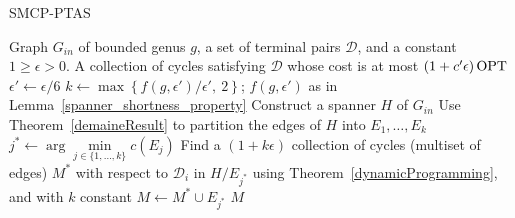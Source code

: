 \begin{algorithm}
\caption{SMCP-PTAS}
\label{smcp-ptas}
\begin{algorithmic}[1]

\Require Graph \(G_{in}\) of bounded genus \(g\), a set of terminal pairs \(\mathcal{D}\), and a constant \(1 \geq \epsilon > 0\).
\Ensure A collection of cycles satisfying \(\mathcal{D}\) whose cost is at most \((1 + c' \epsilon) \operatorname{\textrm{OPT}}\)
\State  \(\epsilon' \gets \epsilon / 6\)
\State  \(k \gets \max\left \{ f(g, \epsilon')/{\epsilon'}, \: 2\right \}\); \(f(g, \epsilon')\) as in Lemma~\ref{spanner_shortness_property} \label{alg_smcp_ptas:k}
\State Construct a spanner \(H\) of \(G_{in}\) \label{alg_smcp_ptas:SpannerCall}
\State Use Theorem~\ref{demaineResult} to partition the edges of \(H\) into \(E_1, \dots, E_k\) \label{alg_smcp_ptas:partDemaine}
\State  \(j^\ast \gets \arg\min\limits_{j \in \{1,\ldots,k\}} c(E_j)\)
\State Find a \((1 + k \epsilon)\) collection of cycles (multiset of edges) \(M^\ast\) with respect to \(\mathcal{D}_i\) in \(H/E_{j^\ast}\) using Theorem~\ref{dynamicProgramming}, and with \(k\) constant \label{alg_smcp_ptas:dp}
\State \(M \gets M^\ast \cup E_{j^\ast}\)
\State \Return  \(M\)

\end{algorithmic}
\end{algorithm}

